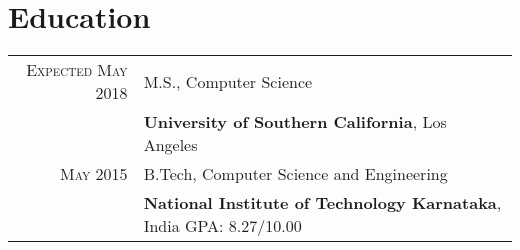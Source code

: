 \section{Education}
\begin{tabular}{rl}

\textsc{Expected May 2018} & M.S., Computer Science\\
&\textbf{University of Southern California}, Los Angeles\hspace{2.8cm} 
\\
\textsc{May} 2015 & B.Tech, Computer Science and Engineering \\
&\textbf{National Institute of Technology Karnataka}, India\hspace{2cm} GPA: 8.27/10.00
\end{tabular}
\vspace{5pt}